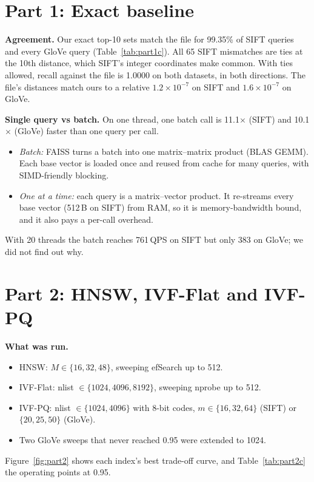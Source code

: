 \documentclass[10pt,twocolumn]{article}
\begin{document}
\section{Part 1: Exact baseline}


\textbf{Agreement.} Our exact top-10 sets match the file for 99.35\% of SIFT queries and every
GloVe query (Table~\ref{tab:part1c}). All 65 SIFT mismatches are ties at the 10th distance, which
SIFT's integer coordinates make common. With ties allowed, recall against the file is 1.0000 on
both datasets, in both directions. The file's distances match ours to a relative
$1.2\times10^{-7}$ on SIFT and $1.6\times10^{-7}$ on GloVe.

\textbf{Single query vs batch.} On one thread, one batch call is 11.1$\times$ (SIFT) and
10.1$\times$ (GloVe) faster than one query per call.
\begin{itemize}
\item \emph{Batch:} FAISS turns a batch into one matrix--matrix product (BLAS GEMM). Each base
  vector is loaded once and reused from cache for many queries, with SIMD-friendly blocking.
\item \emph{One at a time:} each query is a matrix--vector product. It re-streams every base
  vector (512\,B on SIFT) from RAM, so it is memory-bandwidth bound, and it also pays a per-call
  overhead.
\end{itemize}
With 20 threads the batch reaches 761\,QPS on SIFT but only 383 on GloVe; we did not find out why.

\section{Part 2: HNSW, IVF-Flat and IVF-PQ}

\textbf{What was run.}
\begin{itemize}
\item HNSW: $M\in\{16,32,48\}$, sweeping efSearch up to 512.
\item IVF-Flat: nlist $\in\{1024,4096,8192\}$, sweeping nprobe up to 512.
\item IVF-PQ: nlist $\in\{1024,4096\}$ with 8-bit codes, $m\in\{16,32,64\}$ (SIFT) or
  $\{20,25,50\}$ (GloVe).
\item Two GloVe sweeps that never reached 0.95 were extended to 1024.
\end{itemize}
Figure~\ref{fig:part2} shows each index's best trade-off curve, and Table~\ref{tab:part2c} the
operating points at 0.95.
\end{document}

